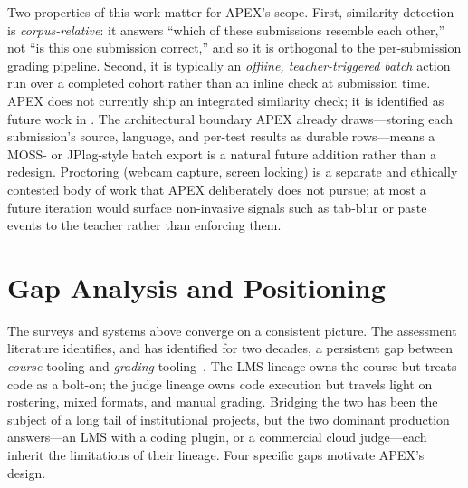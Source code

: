 Two properties of this work matter for APEX's scope. First, similarity detection is
\emph{corpus-relative}: it answers ``which of these submissions resemble each other,'' not
``is this one submission correct,'' and so it is orthogonal to the per-submission grading
pipeline. Second, it is typically an \emph{offline, teacher-triggered batch} action run over
a completed cohort rather than an inline check at submission time. APEX does not currently
ship an integrated similarity check; it is identified as future work in . The
architectural boundary APEX already draws---storing each submission's source, language, and
per-test results as durable rows---means a MOSS- or JPlag-style batch export is a natural
future addition rather than a redesign. Proctoring (webcam capture, screen locking) is a
separate and ethically contested body of work that APEX deliberately does not pursue; at
most a future iteration would surface non-invasive signals such as tab-blur or paste events
to the teacher rather than enforcing them.

\section{Gap Analysis and Positioning}\label{sec:bg-gap}

The surveys and systems above converge on a consistent picture. The assessment literature
identifies, and has identified for two decades, a persistent gap between \emph{course}
tooling and \emph{grading} tooling~\cite{douce2005autoassess,ihantola2010autograding}. The
LMS lineage owns the course but treats code as a bolt-on; the judge lineage owns code
execution but travels light on rostering, mixed formats, and manual grading. Bridging the
two has been the subject of a long tail of institutional projects, but the two dominant
production answers---an LMS with a coding plugin, or a commercial cloud judge---each inherit
the limitations of their lineage. Four specific gaps motivate APEX's design.

